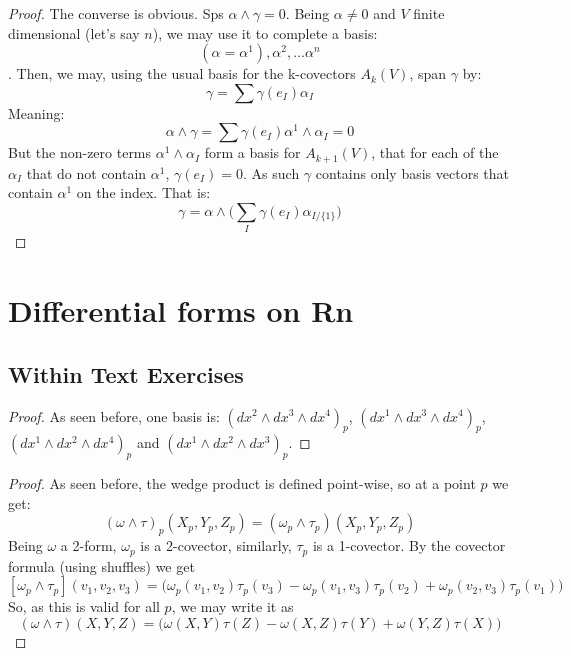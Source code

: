 \begin{problem}
\end{problem}

\begin{proof}
	The converse is obvious. Sps $\alpha \wedge \gamma = 0$. Being $\alpha \neq 0$ and $V$ finite dimensional (let's say $n$), we may use it to complete a basis:
	$$(\alpha = \alpha^1), \alpha^2, \dots \alpha^n$$. Then, we may, using the usual basis for the k-covectors $A_k(V)$, span $\gamma$ by:
	$$\gamma = \sum \gamma(e_I)\alpha_I$$
	Meaning:
	$$\alpha \wedge \gamma = \sum \gamma(e_I) \alpha^1 \wedge \alpha_I = 0$$
	But the non-zero terms $\alpha^1 \wedge \alpha_I$ form a basis for $A_{k+1}(V)$, that for each of the $\alpha_I$ that do not contain
	$\alpha^1$, $\gamma(e_I) = 0$. As such $\gamma$ contains only basis vectors that contain $\alpha^1$ on the index. That is:
	$$\gamma = \alpha \wedge \Bigg( \sum_{I} \gamma(e_I) \alpha_{I / \{ 1\}} \Bigg)$$
\end{proof}

\section{Differential forms on Rn}

\subsection{Within Text Exercises}

\begin{customprob}{4.3}
\end{customprob}
\begin{proof}
	As seen before, one basis is: $(dx^2 \wedge dx^3 \wedge dx^4)_p$, $(dx^1 \wedge dx^3 \wedge dx^4)_p$, $(dx^1 \wedge dx^2 \wedge dx^4)_p$ and
	$(dx^1 \wedge dx^2 \wedge dx^3)_p$.
\end{proof}

\begin{customprob}{4.4}
\end{customprob}

\begin{proof}
	As seen before, the wedge product is defined point-wise, so at a point $p$ we get:
	$$(\omega \wedge \tau)_p(X_p,Y_p,Z_p) = (\omega_p \wedge \tau_p)(X_p,Y_p,Z_p)$$
	Being $\omega$ a 2-form, $\omega_p$ is a 2-covector, similarly, $\tau_p$ is a 1-covector. By the covector formula (using shuffles) we get
	$$[\omega_p \wedge \tau_p](v_1, v_2, v_3) = \bigg(\omega_p(v_1, v_2)\tau_p(v_3) - \omega_p(v_1, v_3)\tau_p(v_2) + \omega_p(v_2, v_3)\tau_p(v_1) \bigg)$$
	So, as this is valid for all $p$, we may write it as
	$$(\omega \wedge \tau)(X,Y,Z) = \bigg(\omega(X, Y)\tau(Z) - \omega(X, Z)\tau(Y) + \omega(Y, Z)\tau(X) \bigg)$$
\end{proof}

